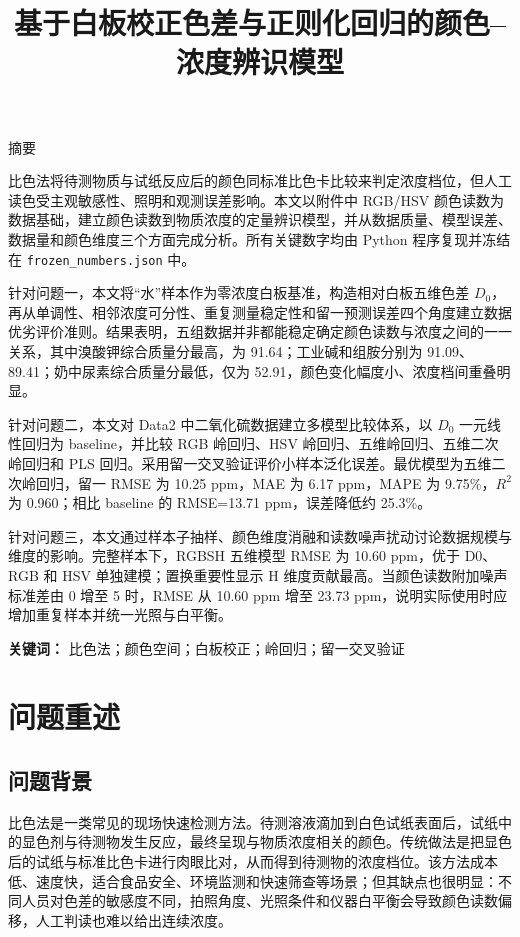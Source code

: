 \documentclass[UTF8,a4paper,12pt]{ctexart}
\title{\heiti\zihao{2} 基于白板校正色差与正则化回归的颜色--浓度辨识模型}
\author{}
\date{}
\begin{document}
\maketitle
\thispagestyle{empty}
\begin{center}\heiti 摘\quad 要\end{center}
比色法将待测物质与试纸反应后的颜色同标准比色卡比较来判定浓度档位，但人工读色受主观敏感性、照明和观测误差影响。本文以附件中 RGB/HSV 颜色读数为数据基础，建立颜色读数到物质浓度的定量辨识模型，并从数据质量、模型误差、数据量和颜色维度三个方面完成分析。所有关键数字均由 Python 程序复现并冻结在 \texttt{frozen\_numbers.json} 中。\par
针对问题一，本文将“水”样本作为零浓度白板基准，构造相对白板五维色差 $D_0$，再从单调性、相邻浓度可分性、重复测量稳定性和留一预测误差四个角度建立数据优劣评价准则。结果表明，五组数据并非都能稳定确定颜色读数与浓度之间的一一关系，其中溴酸钾综合质量分最高，为 91.64；工业碱和组胺分别为 91.09、89.41；奶中尿素综合质量分最低，仅为 52.91，颜色变化幅度小、浓度档间重叠明显。\par
针对问题二，本文对 Data2 中二氧化硫数据建立多模型比较体系，以 $D_0$ 一元线性回归为 baseline，并比较 RGB 岭回归、HSV 岭回归、五维岭回归、五维二次岭回归和 PLS 回归。采用留一交叉验证评价小样本泛化误差。最优模型为五维二次岭回归，留一 RMSE 为 10.25 ppm，MAE 为 6.17 ppm，MAPE 为 9.75\%，$R^2$ 为 0.960；相比 baseline 的 RMSE=13.71 ppm，误差降低约 25.3\%。\par
针对问题三，本文通过样本子抽样、颜色维度消融和读数噪声扰动讨论数据规模与维度的影响。完整样本下，RGBSH 五维模型 RMSE 为 10.60 ppm，优于 D0、RGB 和 HSV 单独建模；置换重要性显示 H 维度贡献最高。当颜色读数附加噪声标准差由 0 增至 5 时，RMSE 从 10.60 ppm 增至 23.73 ppm，说明实际使用时应增加重复样本并统一光照与白平衡。\par
\noindent\textbf{关键词：} 比色法；颜色空间；白板校正；岭回归；留一交叉验证
\newpage
\tableofcontents
\newpage
\section{问题重述}
\subsection{问题背景}
比色法是一类常见的现场快速检测方法。待测溶液滴加到白色试纸表面后，试纸中的显色剂与待测物发生反应，最终呈现与物质浓度相关的颜色。传统做法是把显色后的试纸与标准比色卡进行肉眼比对，从而得到待测物的浓度档位。该方法成本低、速度快，适合食品安全、环境监测和快速筛查等场景；但其缺点也很明显：不同人员对色差的敏感度不同，拍照角度、光照条件和仪器白平衡会导致颜色读数偏移，人工判读也难以给出连续浓度。
\end{document}
